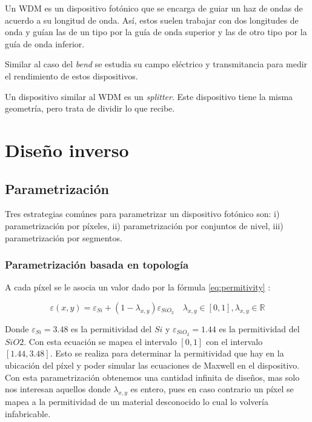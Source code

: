 Un WDM es un dispositivo fotónico que se encarga de guiar un haz de ondas de acuerdo a su longitud de onda.
Así, estos suelen trabajar con dos longitudes de onda y guían las de un tipo por la guía de onda superior y las de otro tipo por la guía de onda inferior.

Similar al caso del \emph{bend} se estudia su campo eléctrico y transmitancia para medir el rendimiento de estos dispositivos.

Un dispositivo similar al WDM es un \emph{splitter}. Este dispositivo tiene la misma geometría, pero trata de dividir lo que recibe.

\section{Diseño inverso}

\subsection{Parametrización}

Tres estrategias comúnes para parametrizar un dispositivo fotónico son: i) parametrización por píxeles, ii) parametrización por conjuntos de nivel, iii) parametrización por segmentos.

\subsubsection{Parametrización basada en topología}

A cada píxel se le asocia un valor dado por la fórmula \ref{eq:permitivity} \citep{Su2020}:

\begin{equation}
  \varepsilon(x, y) = \varepsilon_{Si} + (1 - \lambda_{x,y}) \varepsilon_{SiO_2} \quad \lambda_{x, y} \in [0, 1], \lambda_{x, y} \in \mathbb{R} 
\label{eq:permitivity}
\end{equation}

Donde $\varepsilon_{Si} = 3.48$ es la permitividad del $Si$ y $\varepsilon_{SiO_2} = 1.44$ es la permitividad del $SiO2$.
Con esta ecuación se mapea el intervalo $[0, 1]$ con el intervalo $[1.44, 3.48]$. 
Esto se realiza para determinar la permitividad que hay en la ubicación del píxel y poder simular las ecuaciones de Maxwell en el dispositivo.
Con esta parametrización obtenemos una cantidad infinita de diseños, mas solo nos interesan aquellos donde $\lambda_{x,y}$ es entero, pues en caso contrario un píxel se mapea a la permitividad de un material desconocido lo cual lo volvería infabricable.


